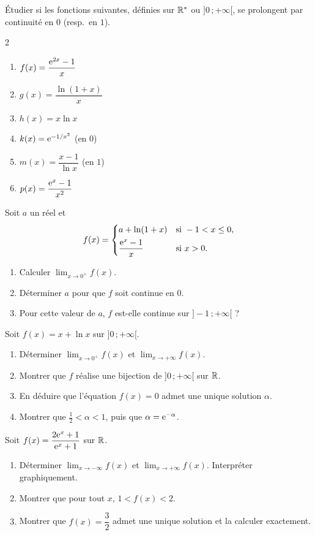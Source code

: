 Étudier si les fonctions suivantes, définies sur $\mathbb{R}^*$ ou $]0\,;+\infty[$,
se prolongent par continuité en $0$ (resp.\ en $1$).
\begin{multicols}{2}
\begin{enumerate}
	\item $f(x)=\dfrac{\mathrm{e}^{2x}-1}{x}$
	\item $g(x)=\dfrac{\ln(1+x)}{x}$
	\item $h(x)=x\ln x$
	\item $k(x)=\mathrm{e}^{-1/x^2}$ (en $0$)
	\item $m(x)=\dfrac{x-1}{\ln x}$ (en $1$)
	\item $p(x)=\dfrac{\mathrm{e}^x-1}{x^2}$
\end{enumerate}
\end{multicols}

Soit $a$ un réel et
\[
f(x)=
\begin{cases}
	a+\ln(1+x) & \text{si } -1<x\leq 0,\\[0.4em]
	\dfrac{\mathrm{e}^{x}-1}{x} & \text{si } x>0.
\end{cases}
\]
\begin{enumerate}
	\item Calculer $\displaystyle\lim_{x\to 0^+}f(x)$.
	\item Déterminer $a$ pour que $f$ soit continue en $0$.
	\item Pour cette valeur de $a$, $f$ est-elle continue sur $]-1\,;+\infty[$ ?
\end{enumerate}

Soit $f(x)=x+\ln x$ sur $]0\,;+\infty[$.
\begin{enumerate}
	\item Déterminer $\displaystyle\lim_{x\to 0^+}f(x)$ et
	$\displaystyle\lim_{x\to+\infty}f(x)$.
	\item Montrer que $f$ réalise une bijection de $]0\,;+\infty[$ sur $\mathbb{R}$.
	\item En déduire que l'équation $f(x)=0$ admet une unique solution $\alpha$.
	\item Montrer que $\tfrac{1}{2}<\alpha<1$, puis que $\alpha=\mathrm{e}^{-\alpha}$.
\end{enumerate}

Soit $f(x)=\dfrac{2\mathrm{e}^x+1}{\mathrm{e}^x+1}$ sur $\mathbb{R}$.
\begin{enumerate}
	\item Déterminer $\displaystyle\lim_{x\to-\infty}f(x)$ et
	$\displaystyle\lim_{x\to+\infty}f(x)$. Interpréter graphiquement.
	\item Montrer que pour tout $x$, $1<f(x)<2$.
	\item Montrer que $f(x)=\dfrac{3}{2}$ admet une unique solution et la
	calculer exactement.
\end{enumerate}


